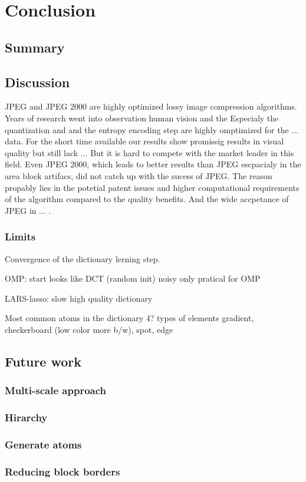 \chapter{Conclusion}
\section{Summary} %

\section{Discussion}

JPEG and JPEG 2000 are highly optimized lossy image compression algorithms. 
Years of research went into observation human vision and the 
Especialy the quantization and and the entropy encoding step are highly omptimized for the ... data.
For the short time available our results show promissig results in visual quality but still lack ...
But it is hard to compete with the market leader in this field.  Even JPEG 2000,
which leads to better results than JPEG escpacialy in the area block artifacs,
did not catch up with the sucess of JPEG. 
The reason propably lies in the potetial patent issues and higher computational requirements of the algorithm compared
to the quality benefits. And the wide accpetance of JPEG in ...
.

\subsection*{Limits}
Convergence of the dictionary lerning step.

OMP:
  start looks like DCT (random init)
  noisy
  only pratical for OMP

LARS-lasso:
  slow 
  high quality dictionary

  Most common atoms in the dictionary 
  4? types of elements
  gradient, checkerboard (low color more b/w), spot, edge

\section{Future work}

\subsection*{Multi-scale approach}
\subsection*{Hirarchy}
\subsection*{Generate atoms}

\subsection*{Reducing block borders}
